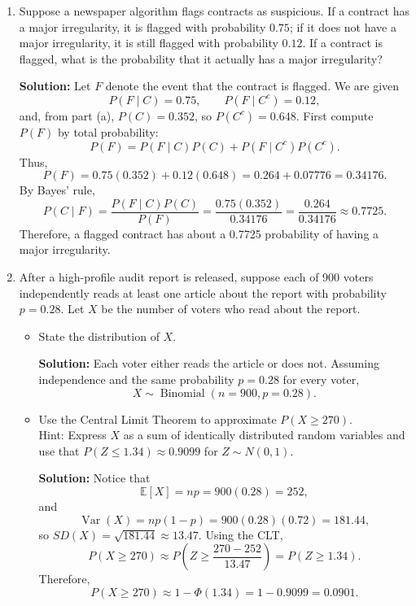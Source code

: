 \documentclass[11pt]{exam}
\begin{document}
\begin{questions}
\begin{enumerate}[leftmargin = 0.5cm, label = (\alph*), rightmargin = 0.2cm]
    \item Suppose a newspaper algorithm flags contracts as suspicious. If a contract has a major irregularity, it is flagged with probability $0.75$; if it does not have a major irregularity, it is still flagged with probability $0.12$. If a contract is flagged, what is the probability that it actually has a major irregularity?

    \begin{solutionorbox}[7cm]
    \textbf{Solution:} Let $F$ denote the event that the contract is flagged. We are given
    \[
    P(F\mid C)=0.75, \qquad P(F\mid C^c)=0.12,
    \]
    and, from part (a), $P(C)=0.352$, so $P(C^c)=0.648$. First compute $P(F)$ by total probability:
    \[
    P(F)=P(F\mid C)P(C)+P(F\mid C^c)P(C^c).
    \]
    Thus,
    \[
    P(F)=0.75(0.352)+0.12(0.648)=0.264+0.07776=0.34176.
    \]
    By Bayes' rule,
    \[
    P(C\mid F)=\frac{P(F\mid C)P(C)}{P(F)}
    =\frac{0.75(0.352)}{0.34176}
    =\frac{0.264}{0.34176}\approx 0.7725.
    \]
    Therefore, a flagged contract has about a 0.7725 probability of having a major irregularity.
    \end{solutionorbox}

    \item After a high-profile audit report is released, suppose each of 900 voters independently reads at least one article about the report with probability $p=0.28$. Let $X$ be the number of voters who read about the report.
    \begin{itemize}
        \item[(i)] State the distribution of $X$.
        \begin{solutionorbox}[2cm]
    \textbf{Solution:} Each voter either reads the article or does not. Assuming independence and the same probability $p=0.28$ for every voter,
        \[
        X\sim \operatorname{Binomial}(n=900,p=0.28).
        \]
    \end{solutionorbox}
        \item[(ii)] Use the Central Limit Theorem to approximate $P(X \geq 270)$. \\
        {\footnotesize Hint: Express $X$ as a sum of identically distributed random variables and use that $P(Z \leq 1.34) \approx 0.9099$ for $Z\sim N(0, 1)$.}
        \begin{solutionorbox}[4cm]
        \end{solutionorbox}
        \begin{solutionorbox}[7cm]
    \textbf{Solution:} Notice that
        \[
        \mathbb{E}[X]=np=900(0.28)=252,
        \]
        and
        \[
        \operatorname{Var}(X)=np(1-p)=900(0.28)(0.72)=181.44,
        \]
        so $SD(X)=\sqrt{181.44}\approx 13.47$. Using the CLT,
        \[
        P(X\geq 270)\approx P\left(Z\geq \frac{270-252}{13.47}\right)
        =P(Z\geq 1.34).
        \]
        Therefore,
        \[
        P(X\geq 270)\approx 1-\Phi(1.34)=1-0.9099=0.0901.
        \]
    \end{solutionorbox}
    \end{itemize}


\end{enumerate}
\end{questions}
\end{document}
